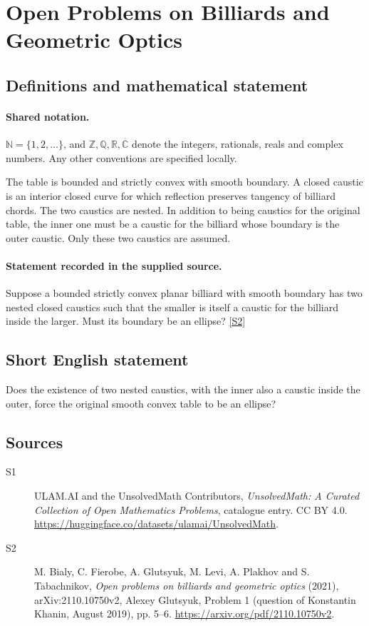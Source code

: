 \documentclass[11pt]{article}
\newcommand{\sref}[2]{\hyperlink{source:#1:#2}{[S#2]}}
\begin{document}
\section{Open Problems on Billiards and Geometric Optics}\label{statement}

\subsection{Definitions and mathematical statement}

\paragraph{Shared notation.}$\mathbb N=\{1,2,\ldots\}$, and $\mathbb Z,\mathbb Q,\mathbb R,\mathbb C$ denote the integers, rationals, reals and complex numbers. Any other conventions are specified locally.


The table is bounded and strictly convex with smooth boundary. A closed caustic is an interior closed curve for which reflection preserves tangency of billiard chords. The two caustics are nested. In addition to being caustics for the original table, the inner one must be a caustic for the billiard whose boundary is the outer caustic. Only these two caustics are assumed.
\paragraph{Statement recorded in the supplied source.}
Suppose a bounded strictly convex planar billiard with smooth boundary has two nested closed caustics such that the smaller is itself a caustic for the billiard inside the larger. Must its boundary be an ellipse? \sref{statement}{2}
\subsection{Short English statement}
Does the existence of two nested caustics, with the inner also a caustic inside the outer, force the original smooth convex table to be an ellipse?
\subsection{Sources}
\begin{description}
\item[\hypertarget{source:statement:1}{S1}] ULAM.AI and the UnsolvedMath Contributors, \emph{UnsolvedMath: A Curated Collection of Open Mathematics Problems}, catalogue entry. CC BY 4.0. \url{https://huggingface.co/datasets/ulamai/UnsolvedMath}.
\item[\hypertarget{source:statement:2}{S2}] M. Bialy, C. Fierobe, A. Glutsyuk, M. Levi, A. Plakhov and S. Tabachnikov, \emph{Open problems on billiards and geometric optics} (2021), arXiv:2110.10750v2, Alexey Glutsyuk, Problem 1 (question of Konstantin Khanin, August 2019), pp. 5--6. \url{https://arxiv.org/pdf/2110.10750v2}.
\end{description}
\label{end:statement}
\end{document}
